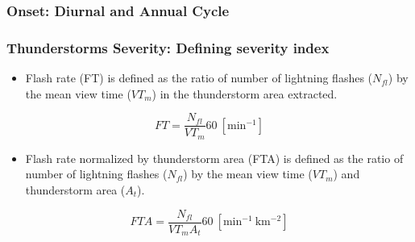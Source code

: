 \documentclass[smaller]{beamer}
\begin{document}
\begin{frame}
\frametitle{Onset: Diurnal and Annual Cycle}

\end{frame} 


\begin{frame}
\frametitle{}

\end{frame}


\begin{frame}
\frametitle{}

\end{frame}

\begin{frame}

\end{frame}

\begin{frame}
\frametitle{Thunderstorms Severity: Defining severity index}

\begin{itemize}
\item Flash rate (FT) is defined as the ratio of number of lightning flashes ($N_{fl}$) by the mean view time ($VT_m$) in the thunderstorm area extracted.	
\end{itemize}

\begin{equation}
FT = \frac{N_{fl} }{VT_m} 60 ~[\mathrm{min^{-1}}]  
\label{eqFT}  
\end{equation}

\begin{itemize}
\item Flash rate  normalized by thunderstorm area (FTA) is defined as the ratio of number of lightning flashes ($N_{fl}$) by the mean view time ($VT_m$) and thunderstorm area ($A_t$). 
\end{itemize}

\begin{equation}
FTA = \frac{N_{fl}}{VT_m A_t } 60 ~[\mathrm{min^{-1}~km^{-2}}]
\label{eqFTA}
\end{equation}


\end{frame}
\end{document}
